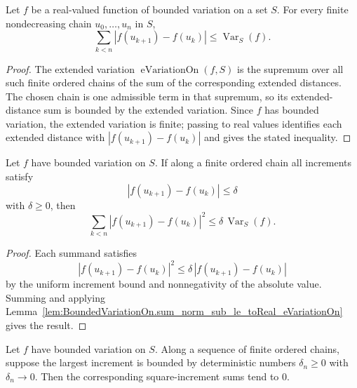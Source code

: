 \begin{lemma}\label{lem:BoundedVariationOn.sum_norm_sub_le_toReal_eVariationOn}
Let \(f\) be a real-valued function of bounded variation on a set \(S\).
For every finite nondecreasing chain \(u_0,\ldots,u_n\) in \(S\),
\[
  \sum_{k<n}|f(u_{k+1})-f(u_k)|
  \le \operatorname{Var}_S(f).
\]
\end{lemma}

\begin{proof}
The extended variation \(\operatorname{eVariationOn}(f,S)\) is the supremum
over all such finite ordered chains of the sum of the corresponding
extended distances.  The chosen chain is one admissible term in that
supremum, so its extended-distance sum is bounded by the extended variation.
Since \(f\) has bounded variation, the extended variation is finite; passing
to real values identifies each extended distance with
\(|f(u_{k+1})-f(u_k)|\) and gives the stated inequality.
\end{proof}


\begin{lemma}\label{lem:BoundedVariationOn.sq_increment_sum_le_uniform_bound}
Let \(f\) have bounded variation on \(S\).  If along a finite ordered chain
all increments satisfy
\[
  |f(u_{k+1})-f(u_k)|\le \delta
\]
with \(\delta\ge0\), then
\[
  \sum_{k<n}|f(u_{k+1})-f(u_k)|^2
  \le
  \delta\,\operatorname{Var}_S(f).
\]
\end{lemma}

\begin{proof}
Each summand satisfies
\[
  |f(u_{k+1})-f(u_k)|^2
  \le
  \delta\,|f(u_{k+1})-f(u_k)|
\]
by the uniform increment bound and nonnegativity of the absolute value.
Summing and applying
Lemma~\ref{lem:BoundedVariationOn.sum_norm_sub_le_toReal_eVariationOn}
gives the result.
\end{proof}


\begin{lemma}\label{lem:BoundedVariationOn.sq_increment_sum_tendsto_zero_of_uniform_bound}
Let \(f\) have bounded variation on \(S\).  Along a sequence of finite
ordered chains, suppose the largest increment is bounded by deterministic
numbers \(\delta_n\ge0\) with \(\delta_n\to0\).  Then the corresponding
square-increment sums tend to \(0\).
\end{lemma}

